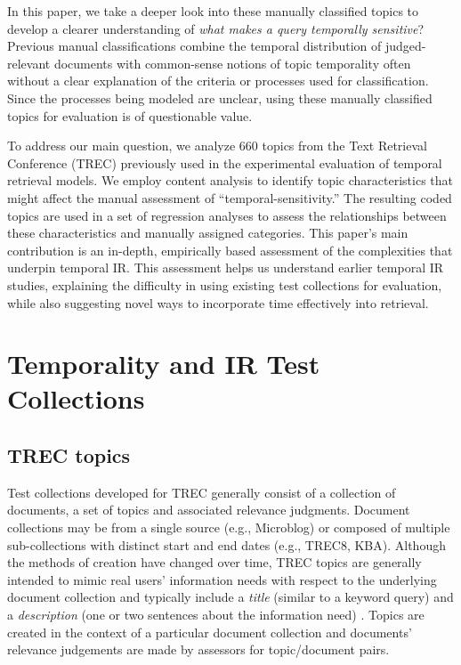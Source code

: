 \documentclass{asist}
\begin{document}
In this paper, we take a deeper look into these manually classified topics to develop a clearer understanding of \emph{what makes a query temporally sensitive}?  Previous manual classifications combine the temporal distribution of judged-relevant documents with common-sense notions of topic temporality often without a clear explanation of the criteria or processes used for classification. Since the processes being modeled are unclear, using these manually classified topics for evaluation is of questionable value. 

To address our main question, we analyze  660 topics from the Text Retrieval Conference (TREC) previously used in the experimental evaluation of temporal retrieval models. We employ content analysis to identify topic characteristics that might affect the manual assessment of ``temporal-sensitivity.'' The resulting coded topics are used in a set of regression analyses to assess the relationships between these characteristics and manually assigned categories.   This paper's main contribution is an in-depth, empirically based assessment of the complexities that underpin temporal IR.  This assessment helps us understand earlier temporal IR studies, explaining the difficulty in using existing test collections for evaluation, while also suggesting novel ways to incorporate time effectively into retrieval.

\section{Temporality and IR Test Collections}

\subsection{TREC topics}

Test collections developed for TREC generally consist of a collection of documents, a set of topics and associated relevance judgments. Document collections may be from a single source (e.g., Microblog) or composed of multiple sub-collections with distinct start and end dates (e.g., TREC8, KBA).  Although the methods of creation have changed over time, TREC topics are generally intended to mimic real users' information needs with respect to the underlying document collection and typically include a \textit{title} (similar to a keyword query) and a \textit{description} (one or two sentences about the information need) \cite{Voorhees2005}.   Topics are created in the context of a particular document collection and documents' relevance judgements are made by assessors for topic/document pairs.
\end{document}

